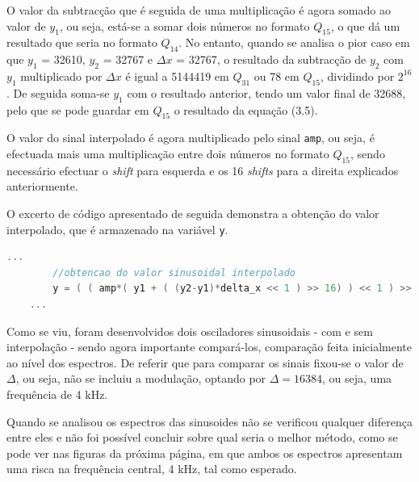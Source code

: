 \documentclass[11pt]{article}
\numberwithin{equation}{section}
\begin{document}
O valor da subtracção que é seguida de uma multiplicação é agora somado ao valor de $y_1$, ou seja, está-se a somar dois números no formato $Q_{15}$, o que dá um resultado que seria no formato $Q_{14}$. No entanto, quando se analisa o pior caso em que $y_1$ = 32610, $y_2$ = 32767 e $\Delta x$ = 32767, o resultado da subtracção de $y_2$ com $y_1$ multiplicado por $\Delta x$ é igual a 5144419 em $Q_{31}$ ou 78 em $Q_{15}$, dividindo por $2^{16}$. De seguida soma-se $y_1$ com o resultado anterior, tendo um valor final de 32688, pelo que se pode guardar em $Q_{15}$ o resultado da equação (3.5).

O valor do sinal interpolado é agora multiplicado pelo sinal \texttt{amp}, ou seja, é efectuada mais uma multiplicação entre dois números no formato $Q_{15}$, sendo necessário efectuar o \textit{shift} para esquerda e os 16 \textit{shifts} para a direita explicados anteriormente.

O excerto de código apresentado de seguida demonstra a obtenção do valor interpolado, que é armazenado na variável \texttt{y}. 

\begin{lstlisting}[language=C]
	...
		//obtencao do valor sinusoidal interpolado 
		y = ( ( amp*( y1 + ( (y2-y1)*delta_x << 1 ) >> 16) ) << 1 ) >> 16);
	...
\end{lstlisting}

Como se viu, foram desenvolvidos dois osciladores sinusoidais - com e sem interpolação - sendo agora importante compará-los, comparação feita inicialmente ao nível dos espectros. De referir que para comparar os sinais fixou-se o valor de $\Delta$, ou seja, não se incluiu a modulação, optando por $\Delta = 16384$, ou seja, uma frequência de 4 kHz. 

Quando se analisou os espectros das sinusoides não se verificou qualquer diferença entre eles e não foi possível concluir sobre qual seria o melhor método, como se pode ver nas figuras da próxima página, em que ambos os espectros apresentam uma risca na frequência central, 4 kHz, tal como esperado.
\end{document}
